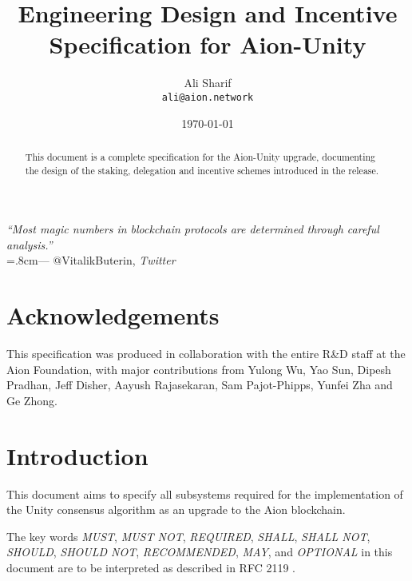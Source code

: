 \documentclass{article}
\title{Engineering Design and Incentive\\Specification for Aion-Unity}
\author{
    Ali Sharif\\
    \texttt{ali@aion.network}
}
\date{\today}
\begin{document}
\maketitle

\begin{flushright}
\rightskip=1.8cm\textit{``Most magic numbers in blockchain protocols are determined through careful analysis.''} \\
\vspace{.2em}
\rightskip=.8cm--- @VitalikButerin, \textit{Twitter}
\end{flushright}
\vspace{1em}

\begin{abstract}
This document is a complete specification for the Aion-Unity upgrade, documenting the design of the staking, delegation and incentive schemes introduced in the release. 
\end{abstract}

\section*{Acknowledgements}
This specification was produced in collaboration with the entire R\&D staff at the Aion Foundation, with major contributions from Yulong Wu, Yao Sun, Dipesh Pradhan, Jeff Disher, Aayush Rajasekaran, Sam Pajot-Phipps, Yunfei Zha and Ge Zhong. 

\newpage
\tableofcontents
\newpage

\section{Introduction}
This document aims to specify all subsystems required for the implementation of the Unity consensus algorithm \cite{WZS19} as an upgrade to the Aion blockchain.

The key words \textit{MUST}, \textit{MUST NOT}, \textit{REQUIRED}, \textit{SHALL}, \textit{SHALL NOT}, \textit{SHOULD}, \textit{SHOULD NOT}, \textit{RECOMMENDED}, \textit{MAY}, and \textit{OPTIONAL} in this document are to be interpreted as described in RFC 2119 \cite{RFC2119}.


%

\pagebreak



\clearpage
\begin{appendices}


\end{appendices}
\end{document}

